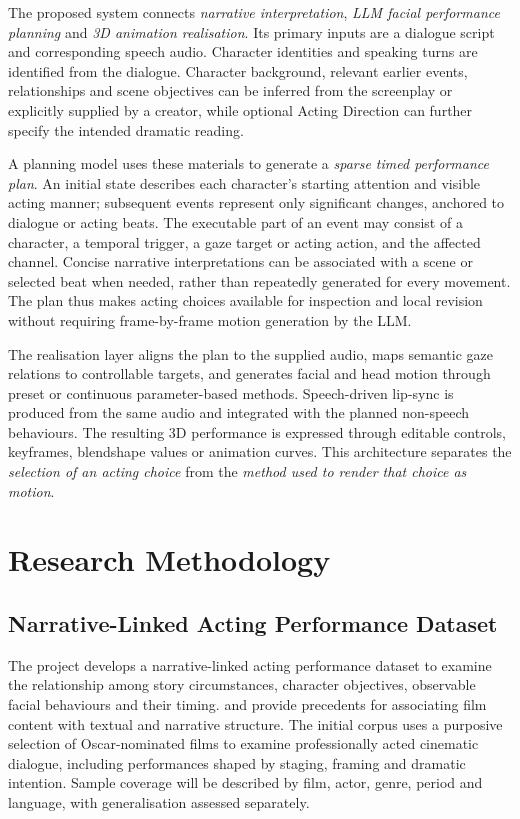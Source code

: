 \documentclass[11pt,a4paper]{article}
\begin{document}
The proposed system connects \emph{narrative interpretation}, \emph{LLM facial performance planning} and \emph{3D animation realisation}. Its primary inputs are a dialogue script and corresponding speech audio. Character identities and speaking turns are identified from the dialogue. Character background, relevant earlier events, relationships and scene objectives can be inferred from the screenplay or explicitly supplied by a creator, while optional Acting Direction can further specify the intended dramatic reading.

A planning model uses these materials to generate a \emph{sparse timed performance plan}. An initial state describes each character's starting attention and visible acting manner; subsequent events represent only significant changes, anchored to dialogue or acting beats. The executable part of an event may consist of a character, a temporal trigger, a gaze target or acting action, and the affected channel. Concise narrative interpretations can be associated with a scene or selected beat when needed, rather than repeatedly generated for every movement. The plan thus makes acting choices available for inspection and local revision without requiring frame-by-frame motion generation by the LLM.

The realisation layer aligns the plan to the supplied audio, maps semantic gaze relations to controllable targets, and generates facial and head motion through preset or continuous parameter-based methods. Speech-driven lip-sync is produced from the same audio and integrated with the planned non-speech behaviours. The resulting 3D performance is expressed through editable controls, keyframes, blendshape values or animation curves. This architecture separates the \emph{selection of an acting choice} from the \emph{method used to render that choice as motion}.

\section{Research Methodology}

\subsection{Narrative-Linked Acting Performance Dataset}

The project develops a narrative-linked acting performance dataset to examine the relationship among story circumstances, character objectives, observable facial behaviours and their timing. \citet{huang2020movienet} and \citet{bain2021condensed} provide precedents for associating film content with textual and narrative structure. The initial corpus uses a purposive selection of Oscar-nominated films to examine professionally acted cinematic dialogue, including performances shaped by staging, framing and dramatic intention. Sample coverage will be described by film, actor, genre, period and language, with generalisation assessed separately.
\end{document}

